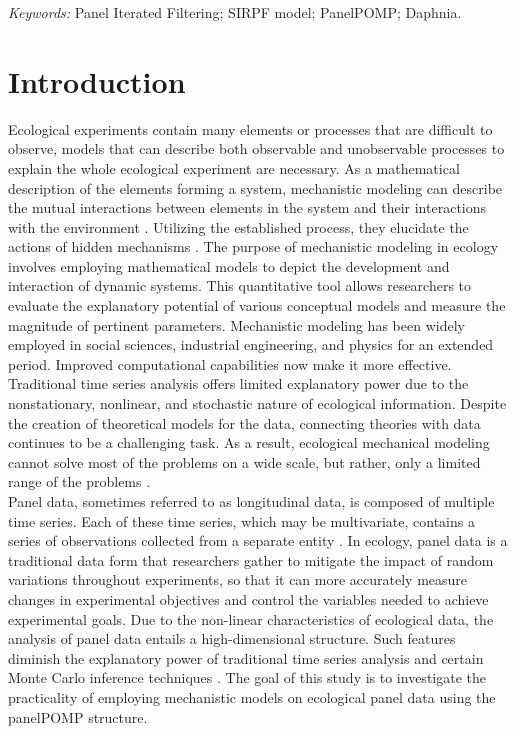 \documentclass[12pt]{article}
\begin{document}
\noindent%
{\it Keywords:}  Panel Iterated Filtering; SIRPF model; PanelPOMP; Daphnia. 
\vfill

\newpage
{} %
\section{Introduction}
\label{sec:intro}

Ecological experiments contain many elements or processes that are difficult to observe, models that can describe both observable and unobservable processes to explain the whole ecological experiment are necessary. As a mathematical description of the elements forming a system, mechanistic modeling can describe the mutual interactions between elements in the system and their interactions with the environment \citep{Stalidzans2020}. Utilizing the established process, they elucidate the actions of hidden mechanisms \citep{Duarte2003}. The purpose of mechanistic modeling in ecology involves employing mathematical models to depict the development and interaction of dynamic systems. This quantitative tool allows researchers to evaluate the explanatory potential of various conceptual models and measure the magnitude of pertinent parameters. Mechanistic modeling has been widely employed in social sciences, industrial engineering, and physics for an extended period. Improved computational capabilities now make it more effective. Traditional time series analysis offers limited explanatory power due to the nonstationary, nonlinear, and stochastic nature of ecological information. Despite the creation of theoretical models for the data, connecting theories with data continues to be a challenging task. As a result, ecological mechanical modeling cannot solve most of the problems on a wide scale, but rather, only a limited range of the problems \citep{Levin_1992}.\\

Panel data, sometimes referred to as longitudinal data, is composed of multiple time series. Each of these time series, which may be multivariate, contains a series of observations collected from a separate entity  \cite{Carles2020}. In ecology, panel data is a traditional data form that researchers gather to mitigate the impact of random variations throughout experiments, so that it can more accurately measure changes in experimental objectives and control the variables needed to achieve experimental goals. Due to the non-linear characteristics of ecological data, the analysis of panel data entails a high-dimensional structure. Such features diminish the explanatory power of traditional time series analysis and certain Monte Carlo inference techniques \cite{johnstone2009statistical}. The goal of this study is to investigate the practicality of employing mechanistic models on ecological panel data using the panelPOMP structure.\\
\end{document}
